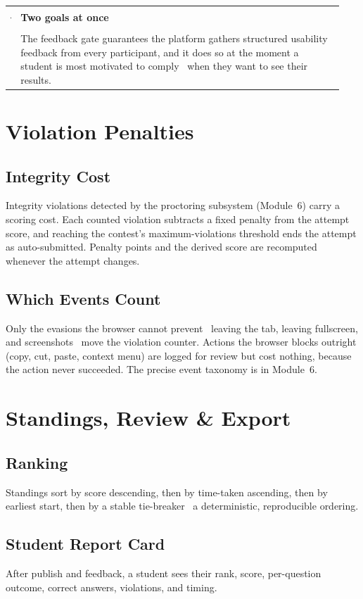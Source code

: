 \documentclass[12pt,a4paper,oneside]{report}
\makeatletter
\newenvironment{callout}[1]{\par\vspace{4pt}\noindent
  \begin{tabular}{@{}p{0.014\linewidth}@{\hspace{0.6em}}p{0.93\linewidth}@{}}
  \textcolor{boxframe}{\rule{2pt}{\baselineskip}} & \textbf{\textcolor{tcetblue}{#1}}\\[2pt] & }{\end{tabular}\par\vspace{6pt}}
\makeatother
\begin{document}
\begin{callout}{Two goals at once}
The feedback gate guarantees the platform gathers structured usability feedback
from every participant, and it does so at the moment a student is most motivated
to comply \textemdash\ when they want to see their results.
\end{callout}

\chapter{Violation Penalties}
\section{Integrity Cost}
Integrity violations detected by the proctoring subsystem (Module~6) carry a
scoring cost. Each counted violation subtracts a fixed penalty from the attempt
score, and reaching the contest's maximum-violations threshold ends the attempt
as auto-submitted. Penalty points and the derived score are recomputed whenever
the attempt changes.

\section{Which Events Count}
Only the evasions the browser cannot prevent \textemdash\ leaving the tab,
leaving fullscreen, and screenshots \textemdash\ move the violation counter.
Actions the browser blocks outright (copy, cut, paste, context menu) are logged
for review but cost nothing, because the action never succeeded. The precise
event taxonomy is in Module~6.

\chapter{Standings, Review \& Export}
\section{Ranking}
Standings sort by score descending, then by time-taken ascending, then by
earliest start, then by a stable tie-breaker \textemdash\ a deterministic,
reproducible ordering.

\section{Student Report Card}
After publish and feedback, a student sees their rank, score, per-question
outcome, correct answers, violations, and timing.
\end{document}
